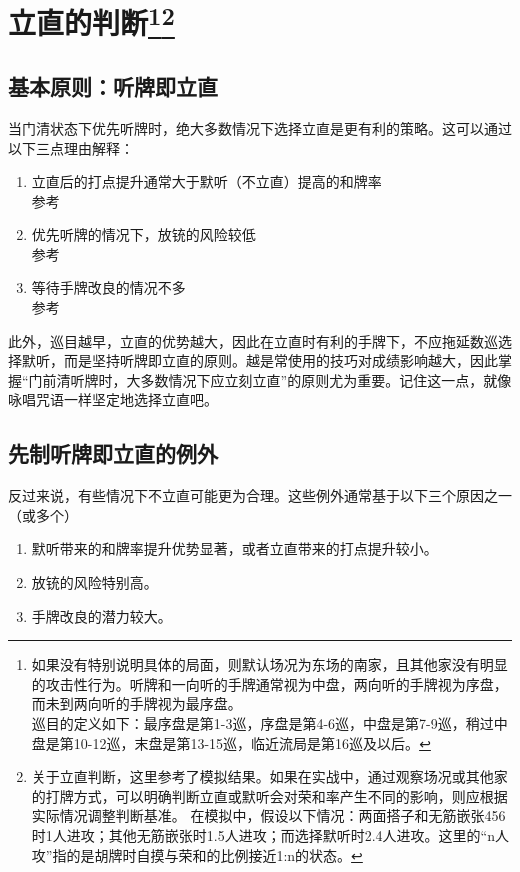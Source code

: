 \chapter[立直的判断]{立直的判断\footnote{如果没有特别说明具体的局面，则默认场况为东场的南家，且其他家没有明显的攻击性行为。听牌和一向听的手牌通常视为中盘，两向听的手牌视为序盘，而未到两向听的手牌视为最序盘。\\ 巡目的定义如下：最序盘是第1-3巡，序盘是第4-6巡，中盘是第7-9巡，稍过中盘是第10-12巡，末盘是第13-15巡，临近流局是第16巡及以后。}\footnote{关于立直判断，这里参考了模拟结果。如果在实战中，通过观察场况或其他家的打牌方式，可以明确判断立直或默听会对荣和率产生不同的影响，则应根据实际情况调整判断基准。
      在模拟中，假设以下情况：两面搭子和无筋嵌张456时1人进攻；其他无筋嵌张时1.5人进攻；而选择默听时2.4人进攻。这里的“n人攻”指的是胡牌时自摸与荣和的比例接近1:n的状态。}}
\label{lecture2}
\section{基本原则：听牌即立直}
当门清状态下优先听牌时，绝大多数情况下选择立直是更有利的策略。这可以通过以下三点理由解释：
\begin{enumerate}
    \item 立直后的打点提升通常大于默听（不立直）提高的和牌率\\
          参考
    \item 优先听牌的情况下，放铳的风险较低\\
          参考
    \item 等待手牌改良的情况不多\\
          参考
\end{enumerate}
此外，巡目越早，立直的优势越大，因此在立直时有利的手牌下，不应拖延数巡选择默听，而是坚持听牌即立直的原则。越是常使用的技巧对成绩影响越大，因此掌握“门前清听牌时，大多数情况下应立刻立直”的原则尤为重要。记住这一点，就像咏唱咒语一样坚定地选择立直吧。

\section{先制听牌即立直的例外}
反过来说，有些情况下不立直可能更为合理。这些例外通常基于以下三个原因之一（或多个）
\begin{enumerate}
    \item 默听带来的和牌率提升优势显著，或者立直带来的打点提升较小。
    \item 放铳的风险特别高。
    \item 手牌改良的潜力较大。
\end{enumerate}

